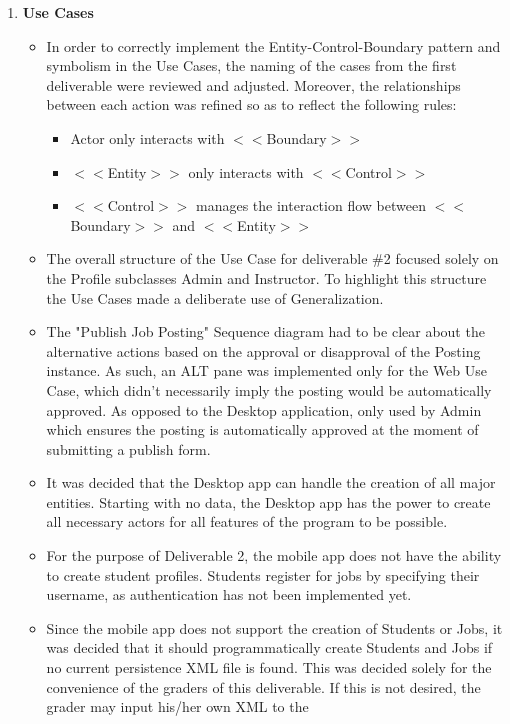 \documentclass[12pt]{article}
\begin{document}
\begin{enumerate}
    \item \textbf{Use Cases}
    \begin{itemize}
    	\item In order to correctly implement the Entity-Control-Boundary pattern and symbolism in the Use Cases, the naming of the cases from the first deliverable were reviewed and adjusted. Moreover, the relationships between each action was refined so as to reflect the following rules:
    	\begin{itemize}
    	    \item Actor only interacts with $<<$Boundary$>>$
    	    \item $<<$Entity$>>$ only interacts with $<<$Control$>>$
    	    \item $<<$Control$>>$ manages the interaction flow between $<<$Boundary$>>$ and $<<$Entity$>>$
    	\end{itemize}
    	\item The overall structure of the Use Case for deliverable \#2 focused solely on the Profile subclasses Admin and Instructor. To highlight this structure the Use Cases made a deliberate use of Generalization.
        \item The "Publish Job Posting" Sequence diagram had to be clear about the alternative actions based on the approval or disapproval of the Posting instance. As such, an ALT pane was implemented only for the Web Use Case, which didn't necessarily imply the posting would be automatically approved. As opposed to the Desktop application, only used by Admin which ensures the posting is automatically approved at the moment of submitting a publish form.
		\item It was decided that the Desktop app can handle the creation of all major entities.
			Starting with no data, the Desktop app has the power to create all necessary actors for
			all features of the program to be possible.
		\item For the purpose of Deliverable 2, the mobile app does not have the ability to create
			student profiles. Students register for jobs by specifying their username, as
			authentication has not been implemented yet.
		\item Since the mobile app does not support the creation of Students or Jobs, it was decided
			that it should programmatically create Students and Jobs if no current persistence XML
			file is found. This was decided solely for the convenience of the graders of this
			deliverable. If this is not desired, the grader may input his/her own XML to the

\end{itemize}
\end{enumerate}
\end{document}
